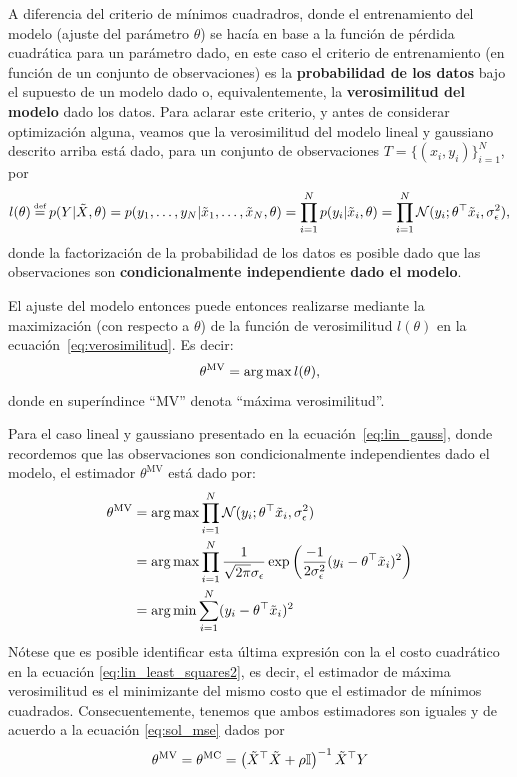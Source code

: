 A diferencia del criterio de mínimos cuadradros, donde el entrenamiento del modelo (ajuste del parámetro $\theta$) se hacía en base a la función de pérdida cuadrática para un parámetro dado, en este caso el criterio de entrenamiento (en función de un conjunto de observaciones) es la \textbf{probabilidad de los datos} bajo el supuesto de un modelo dado o, equivalentemente, la \textbf{verosimilitud del modelo} dado los datos. Para aclarar este criterio, y antes de considerar optimización alguna, veamos que la verosimilitud del modelo lineal y gaussiano descrito arriba está dado, para un conjunto de observaciones $T=\{(x_i,y_i)\}_{i=1}^N$, por 
\begin{equation}
	l(\theta) \deq p(Y|\tX,\theta) = p(y_1,\ldots,y_N|\tx_1,\ldots,\tx_N,\theta)= \prod_{i=1}^Np(y_i|\tx_i,\theta) = \prod_{i=1}^N \cN(y_i;\theta^\top\tx_i,\sigma_\epsilon^2), \label{eq:verosimilitud}
\end{equation} 
donde la factorización de la probabilidad de los datos es posible dado que las observaciones son \textbf{condicionalmente independiente dado el modelo}.

El ajuste del modelo entonces puede entonces realizarse mediante la maximización (con respecto a $\theta$) de la función de verosimilitud $l(\theta)$ en la ecuación~\eqref{eq:verosimilitud}. Es decir: 
\begin{equation}
	\theta^{\text{MV}}= \operatorname*{arg\,max} l(\theta),
\end{equation}
donde en superíndince ``MV'' denota ``máxima verosimilitud''. 

Para el caso lineal y gaussiano presentado en la ecuación~\eqref{eq:lin_gauss}, donde recordemos que las observaciones son condicionalmente independientes dado el modelo, el estimador $\theta^{\text{MV}}$ está dado por:
\begin{align}
	\theta^{\text{MV}} 	&= \operatorname*{arg\,max} \prod_{i=1}^N {\mathcal N}(y_i;\theta^\top\tilde{x}_i,\sigma_\epsilon^2) \\
						&= \operatorname*{arg\,max} \prod_{i=1}^N \frac{1}{\sqrt{2\pi}\sigma_\epsilon} \exp\left({\frac{-1}{2\sigma_\epsilon^2}(y_i-\theta^\top\tilde{x}_i)^2}\right) \nonumber\\
						&= \operatorname*{arg\,min} \sum_{i=1}^N (y_i-\theta^\top\tilde{x}_i)^2 \nonumber
\end{align}
Nótese que es posible identificar esta última expresión con la el costo cuadrático en la ecuación \eqref{eq:lin_least_squares2}, es decir, el estimador de máxima verosimilitud es el minimizante del mismo costo que el estimador de mínimos cuadrados. Consecuentemente, tenemos que ambos estimadores son iguales y de acuerdo a la ecuación \eqref{eq:sol_mse} dados por 
\begin{equation}
	\theta^{\text{MV}} = \theta^{\text{MC}} = \left(\tilde{X}^\top\tilde{X} +\rho {\mathbb I}\right)^{-1} \tilde{X}^\top Y 
\end{equation}
\\


